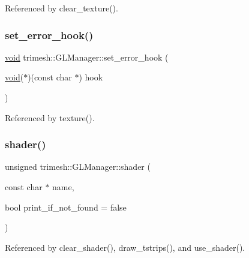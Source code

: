 Referenced by clear\+\_\+texture().

\mbox{\label{classtrimesh_1_1GLManager_a24c890057b5373b8a618a524b07065ba}} 
\subsubsection{\texorpdfstring{set\+\_\+error\+\_\+hook()}{set\_error\_hook()}}
{\footnotesize\ttfamily \hyperlink{namespacetrimesh_a784ddfd979e1c579bda795a8edfc3f43}{void} trimesh\+::\+G\+L\+Manager\+::set\+\_\+error\+\_\+hook (\begin{DoxyParamCaption}\item[{\hyperlink{namespacetrimesh_a784ddfd979e1c579bda795a8edfc3f43}{void}($\ast$)(const char $\ast$)}]{hook }\end{DoxyParamCaption})}



Referenced by texture().

\mbox{\label{classtrimesh_1_1GLManager_a4bc553b4af1b1bb30416b892650b0f9c}} 
\subsubsection{\texorpdfstring{shader()}{shader()}}
{\footnotesize\ttfamily unsigned trimesh\+::\+G\+L\+Manager\+::shader (\begin{DoxyParamCaption}\item[{const char $\ast$}]{name,  }\item[{bool}]{print\+\_\+if\+\_\+not\+\_\+found = {\ttfamily false} }\end{DoxyParamCaption})}



Referenced by clear\+\_\+shader(), draw\+\_\+tstrips(), and use\+\_\+shader().

\mbox{\label{classtrimesh_1_1GLManager_a3be8016421dd828aad517bd23df204ae}} 
